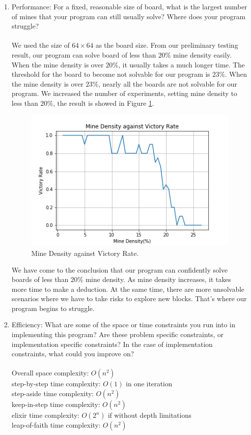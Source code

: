 \documentclass[letter]{article}
\begin{document}
\begin{enumerate}
	\label{zhichao1}
	\item {Performance: For a fixed, reasonable size of board, what is the largest number of mines that your program can still usually solve? Where does your program struggle?} \\
	\\
	We used the size of $ 64 \times 64 $ as the board size. From our preliminary testing result, our program can solve board of less than $ 20\% $ mine density easily. When the mine density is over $ 20\% $, it usually takes a much longer time. The threshold for the board to become not solvable for our program is $ 23\% $. When the mine density is over $ 23\% $, nearly all the boards are not solvable for our program. We increased the number of experiments, setting mine density to less than $ 20\% $, the result is showed in Figure \ref{fig:Mine-Density-against-Victory-Rate}.
	
	\begin{figure}[H]
		\centering
		\includegraphics[scale=0.75]{../pics/Mine-Density-against-Victory-Rate.png}
		\caption{\label{fig:Mine-Density-against-Victory-Rate}Mine Density against Victory Rate.}
	\end{figure}
	
	We have come to the conclusion that our program can confidently solve boards of less than $ 20\% $ mine density. 
	As mine density increases, it takes more time to make a deduction. At the same time, there are more unsolvable scenarios where we have to take risks to explore new blocks. That’s where our program begins to struggle.
	
	\item {Efficiency: What are some of the space or time constraints you run into in implementing this program? Are these problem specific constraints, or implementation specific constraints? In the case of implementation constraints, what could you improve on?} \\
	\\
	Overall space complexity: $ O(n^2) $ \\
	step-by-step time complexity: $ O(1) $ in one iteration \\
	step-aside time complexity: $ O(n^2) $ \\
	keep-in-step time complexity: $ O(n^2) $ \\
	elixir time complexity: $ O(2^n) $ if without depth limitations \\
	leap-of-faith time complexity: $ O(n^2) $ \\
	

\end{enumerate}
\end{document}
